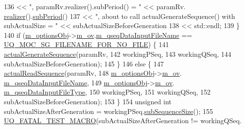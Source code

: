 \begin{DoxyCode}
136                             << \textcolor{stringliteral}{", paramRv.realizer().subPeriod() = "}                            << paramRv.
      \hyperlink{class_q_u_e_s_o_1_1_base_vector_r_v_aea4b01eef0baf36944d14459a7b9ccf4}{realizer}().\hyperlink{class_q_u_e_s_o_1_1_base_vector_realizer_ad9fda59efacf5bd84c472c96dfa00613}{subPeriod}()
137                             << \textcolor{stringliteral}{", about to call actualGenerateSequence() with subActualSize = "} << 
      subActualSizeBeforeGeneration
138                             << std::endl;
139   \}
140   \textcolor{keywordflow}{if} (\hyperlink{class_q_u_e_s_o_1_1_monte_carlo_s_g_acf7ce935648fd3a5d0ee23685708b4ca}{m\_optionsObj}->\hyperlink{class_q_u_e_s_o_1_1_monte_carlo_s_g_options_a4bc6849a41ede87425cad9ab6e97df11}{m\_ov}.\hyperlink{class_q_u_e_s_o_1_1_mc_options_values_aedf79873213bca688ebbf6d873f42e8e}{m\_qseqDataInputFileName} == 
      \hyperlink{_monte_carlo_s_g_options_8h_a0c480f57c47ffbb3b11b838ba7734d15}{UQ\_MOC\_SG\_FILENAME\_FOR\_NO\_FILE}) \{
141     \hyperlink{class_q_u_e_s_o_1_1_monte_carlo_s_g_a597d3e067242d2df4de08b7d2c1e3fd1}{actualGenerateSequence}(paramRv,
142                            workingPSeq,
143                            workingQSeq,
144                            subActualSizeBeforeGeneration);
145   \}
146   \textcolor{keywordflow}{else} \{
147     \hyperlink{class_q_u_e_s_o_1_1_monte_carlo_s_g_ac0ff47f13f63c034eeb8dc39d2b0b13e}{actualReadSequence}(paramRv,
148                        \hyperlink{class_q_u_e_s_o_1_1_monte_carlo_s_g_acf7ce935648fd3a5d0ee23685708b4ca}{m\_optionsObj}->\hyperlink{class_q_u_e_s_o_1_1_monte_carlo_s_g_options_a4bc6849a41ede87425cad9ab6e97df11}{m\_ov}.
      \hyperlink{class_q_u_e_s_o_1_1_mc_options_values_aedf79873213bca688ebbf6d873f42e8e}{m\_qseqDataInputFileName},
149                        \hyperlink{class_q_u_e_s_o_1_1_monte_carlo_s_g_acf7ce935648fd3a5d0ee23685708b4ca}{m\_optionsObj}->\hyperlink{class_q_u_e_s_o_1_1_monte_carlo_s_g_options_a4bc6849a41ede87425cad9ab6e97df11}{m\_ov}.
      \hyperlink{class_q_u_e_s_o_1_1_mc_options_values_ac44d90277d7ba36d096ca5254614440d}{m\_qseqDataInputFileType},
150                        workingPSeq,
151                        workingQSeq,
152                        subActualSizeBeforeGeneration);
153   \}
154   \textcolor{keywordtype}{unsigned} \textcolor{keywordtype}{int} subActualSizeAfterGeneration = workingPSeq.\hyperlink{class_q_u_e_s_o_1_1_base_vector_sequence_afd6278702d40bdf1044697bbd6ad1957}{subSequenceSize}();
155   \hyperlink{_defines_8h_a56d63d18d0a6d45757de47fcc06f574d}{UQ\_FATAL\_TEST\_MACRO}(subActualSizeAfterGeneration != workingQSeq.

\end{DoxyCode}
